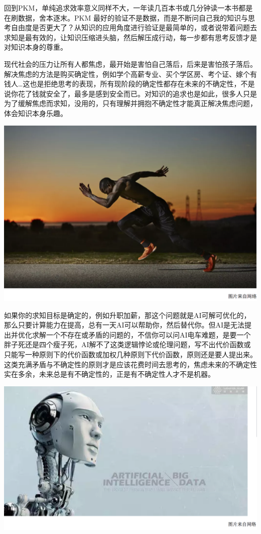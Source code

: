\documentclass[]{book}
\begin{document}
回到PKM，单纯追求效率意义同样不大，一年读几百本书或几分钟读一本书都是在刷数据，舍本逐末。PKM 最好的验证不是数据，而是不断问自己我的知识与思考自由度是否更大了？从知识的应用角度进行验证是最简单的，或者说带着问题去求知是最有效的，让知识压缩进头脑，然后解压成行动，每一步都有思考反馈才是对知识本身的尊重。

现代社会的压力让所有人都焦虑，最开始是害怕自己落后，后来是害怕孩子落后。解决焦虑的方法是购买确定性，例如学个高薪专业、买个学区房、考个证、嫁个有钱人\ldots{}这也是拒绝思考的表现，所有现阶段的确定性都存在未来的不确定性，不是说你花了钱就安全了，最多是感到安全而已。对知识的追求也是如此，很多人只是为了缓解焦虑而求知，没用的，只有理解并拥抱不确定性才能真正解决焦虑问题，体会知识本身乐趣。

\includegraphics[width=8.33in]{images/gtd4}

如果你的求知目标是确定的，例如升职加薪，那这个问题就是AI可解可优化的，那么只要计算能力在提高，总有一天AI可以帮助你，然后替代你。但AI是无法提出并优化求解一个不存在或矛盾的问题的，不信你可以问AI电车难题，是要一个胖子死还是四个瘦子死，AI解不了这类逻辑悖论或伦理问题，写不出代价函数或只能写一种原则下的代价函数或加权几种原则下代价函数，原则还是要人提出来。这类充满矛盾与不确定性的原则才是应该花费时间去思考的，焦虑未来的不确定性实在多余，未来总是有不确定性的，正是有不确定性人才不是机器。

\includegraphics[width=8.33in]{images/gtd5}
\end{document}
